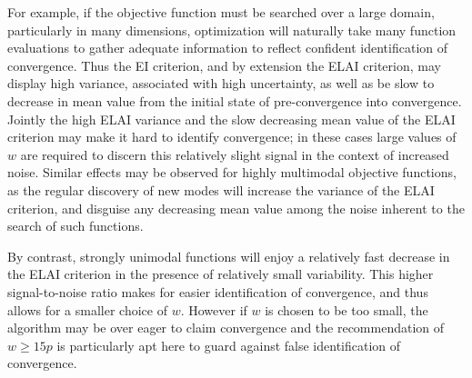 \documentclass[12pt]{article}
\begin{document}
%
For example, if the objective function must be searched over a large domain, particularly in many dimensions, optimization will naturally take many function evaluations to gather adequate information to reflect confident identification of convergence.
%
Thus the EI criterion, and by extension the ELAI criterion, may display high variance, associated with high uncertainty, as well as be slow to decrease in mean value from the initial state of pre-convergence into convergence.
%
Jointly the high ELAI variance and the slow decreasing mean value of the ELAI criterion may make it hard to identify convergence; in these cases large values of $w$ are required to discern this relatively slight signal in the context of increased noise.
%
Similar effects may be observed for highly multimodal objective functions, as the regular discovery of new modes will increase the variance of the ELAI criterion, and disguise any decreasing mean value among the noise inherent to the search of such functions.

%
%
% 
%
%

%
By contrast, strongly unimodal functions will enjoy a relatively fast decrease in the ELAI criterion in the presence of relatively small variability.
%
This higher signal-to-noise ratio makes for easier identification of convergence, and thus allows for a smaller choice of $w$. %
%
However if $w$ is chosen to be too small, the algorithm may be over eager to claim convergence and the recommendation of $w\ge15p$ is particularly apt here to guard against false identification of convergence.   

%
%
\end{document}
